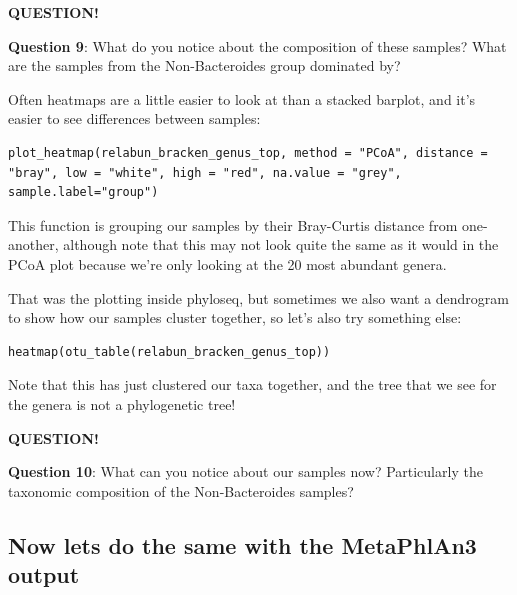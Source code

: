 \documentclass[
]{book}
\newenvironment{bluebox}{
  \definecolor{shadecolor}{RGB}{172, 210, 237}
  \color{white}
  \begin{shaded}}
 {\end{shaded}}
\begin{document}
\begin{bluebox}

\begin{center}
\textbf{QUESTION!}

\end{center}

\textbf{Question 9}: What do you notice about the composition of these samples? What are the samples from the Non-Bacteroides group dominated by?

\end{bluebox}

Often heatmaps are a little easier to look at than a stacked barplot, and it's easier to see differences between samples:

\begin{verbatim}
plot_heatmap(relabun_bracken_genus_top, method = "PCoA", distance = "bray", low = "white", high = "red", na.value = "grey", sample.label="group")
\end{verbatim}

This function is grouping our samples by their Bray-Curtis distance from one-another, although note that this may not look quite the same as it would in the PCoA plot because we're only looking at the 20 most abundant genera.

That was the plotting inside phyloseq, but sometimes we also want a dendrogram to show how our samples cluster together, so let's also try something else:

\begin{verbatim}
heatmap(otu_table(relabun_bracken_genus_top))
\end{verbatim}

Note that this has just clustered our taxa together, and the tree that we see for the genera is not a phylogenetic tree!

\begin{bluebox}

\begin{center}
\textbf{QUESTION!}

\end{center}

\textbf{Question 10}: What can you notice about our samples now? Particularly the taxonomic composition of the Non-Bacteroides samples?

\end{bluebox}

\subsection{Now lets do the same with the MetaPhlAn3 output}\label{now-lets-do-the-same-with-the-metaphlan3-output}
\end{document}
